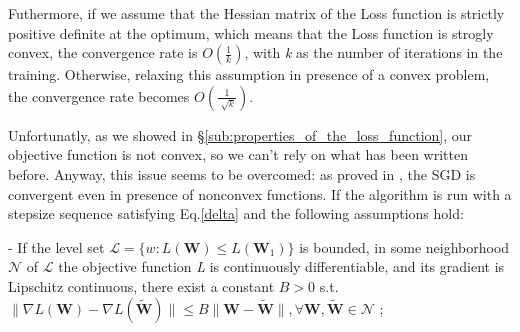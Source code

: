 		Futhermore, if we assume that the Hessian matrix of the Loss function is strictly positive definite at the optimum, which means that the Loss function is strogly convex, the convergence rate is $O(\frac{1}{k})$, with \textit{k} as the number of iterations in the training. %
		Otherwise, relaxing this assumption in presence of a convex problem, the convergence rate becomes $O(\frac{1}{\sqrt[]{k}})$\cite{Goodfellow-et-al-2016,Montavon:2012:NNT:2480981,Saad:1999:OLN:304710}.

		Unfortunatly, as we showed in \S\ref{sub:properties_of_the_loss_function}, our objective function is not convex, so we can't rely on what has been written before. Anyway, this issue seems to be overcomed: as proved in \cite{1606.04838}, the SGD is convergent even in presence of nonconvex functions.
		If the algorithm is run with a stepsize sequence satisfying Eq.\ref{delta} and the following assumptions hold:

		\begin{asu} - \label{as:conv}
  				If the level set $\mathcal{L} = \{w : \textit{L}(\textbf{W}) \leq L(\textbf{W}_1)\}$ is bounded,
  				in some neighborhood $\mathcal{N}$ of $\mathcal{L}$ the objective function \textit{L} is
  				continuously differentiable, and its gradient is Lipschitz continuous, there exist a constant $B >
  				0$ s.t. $\|\nabla\textit{L}(\textbf{W})-\nabla\textit{L}(\widetilde{\textbf{W}})\| \leq B\|
  				\textbf{W}-\widetilde{\textbf{W}}\| , \forall \textbf{W},\widetilde{\textbf{W}} \in \mathcal{N}$ ;
		\end{asu}

